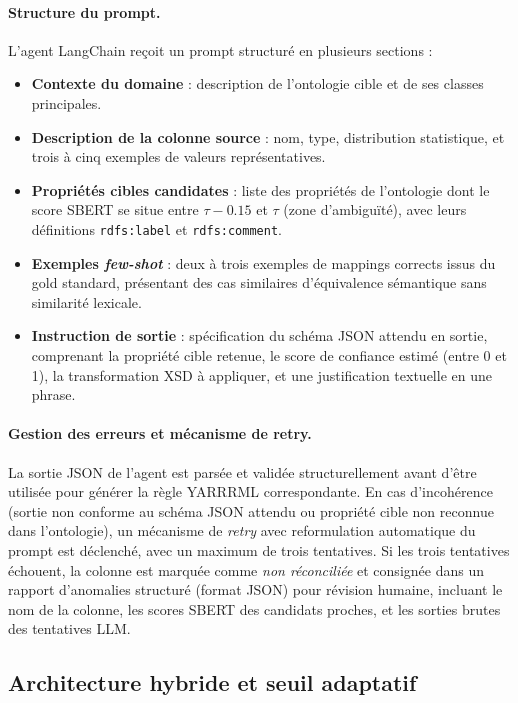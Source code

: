 \paragraph{Structure du prompt.}
L'agent LangChain reçoit un prompt structuré en plusieurs sections :
\begin{itemize}
    \item \textbf{Contexte du domaine} : description de l'ontologie
          cible et de ses classes principales.
    \item \textbf{Description de la colonne source} : nom, type,
          distribution statistique, et trois à cinq exemples de
          valeurs représentatives.
    \item \textbf{Propriétés cibles candidates} : liste des propriétés
          de l'ontologie dont le score SBERT se situe entre
          $\tau - 0.15$ et $\tau$ (zone d'ambiguïté), avec leurs
          définitions \texttt{rdfs:label} et \texttt{rdfs:comment}.
    \item \textbf{Exemples \textit{few-shot}} :
          deux à trois exemples de mappings corrects issus du gold
          standard, présentant des cas similaires d'équivalence
          sémantique sans similarité lexicale.
    \item \textbf{Instruction de sortie} :
          spécification du schéma JSON attendu en sortie, comprenant
          la propriété cible retenue, le score de confiance estimé
          (entre 0 et 1), la transformation XSD à appliquer, et une
          justification textuelle en une phrase.
\end{itemize}

\paragraph{Gestion des erreurs et mécanisme de retry.}
La sortie JSON de l'agent est parsée et validée structurellement
avant d'être utilisée pour générer la règle YARRRML correspondante.
En cas d'incohérence (sortie non conforme au schéma JSON attendu
ou propriété cible non reconnue dans l'ontologie), un mécanisme
de \textit{retry} avec reformulation automatique du prompt est
déclenché, avec un maximum de trois tentatives.
Si les trois tentatives échouent, la colonne est marquée comme
\textit{non réconciliée} et consignée dans un rapport d'anomalies
structuré (format JSON) pour révision humaine, incluant le nom
de la colonne, les scores SBERT des candidats proches, et les
sorties brutes des tentatives LLM.


\subsection{Architecture hybride et seuil adaptatif}

